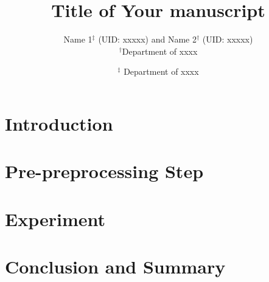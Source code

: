 \documentclass[12pt]{article}
\begin{document}
\title{\Large \bf Title of Your manuscript}
 
	\author{
		Name 1$^{\ddag}$ (UID: xxxxx) and Name 2$^{\dag}$ (UID: xxxxx)\\
		$^\dag$Department of xxxx  \\
				\and
		$^{\ddag}$ Department of xxxx \\
	}

\date{}
\maketitle

\section{Introduction}



\section{Pre-preprocessing Step}


\section{Experiment}



\section{Conclusion and Summary}
\end{document}
